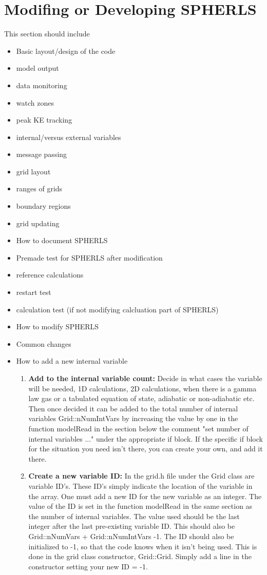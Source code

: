 \documentclass[12pt,a4paper]{book}
\begin{document}
\section{Modifing or Developing SPHERLS}
This section should include
\begin{itemize}
\item Basic layout/design of the code
\item model output
\item data monitoring
\item watch zones
\item peak KE tracking
\item internal/versus external variables
\item message passing
\item grid layout
\item ranges of grids
\item boundary regions
\item grid updating
\item How to document SPHERLS
\item Premade test for SPHERLS after modification
\item reference calculations
\item restart test
\item calculation test (if not modifying calcluation part of SPHERLS)
\item How to modify SPHERLS
\item Common changes
\item How to add a new internal variable
\begin{enumerate}
\item \textbf{Add to the internal variable count:} Decide in what cases the variable will be needed, 1D calculations, 2D calculations, when there is a gamma law gas or a tabulated equation of state, adiabatic or non-adiabatic etc. Then once decided it can be added to the total number of internal variables Grid::nNumIntVars by increasing the value by one in the function modelRead in the section below the comment "set number of internal variables ..." under the appropriate if block. If the specific if block for the situation you need isn't there, you can create your own, and add it there.
\item \textbf{Create a new variable ID:} In the grid.h file under the Grid class are variable ID's. These ID's simply indicate the location of the variable in the array. One must add a new ID for the new variable as an integer. The value of the ID is set in the function modelRead in the same section as the number of internal variables. The value used should be the last integer after the last pre-existing variable ID. This should also be Grid::nNumVars + Grid::nNumIntVars -1. The ID should also be initialized to -1, so that the code knows when it isn't being used. This is done in the grid class constructor, Grid::Grid. Simply add a line in the constructor setting your new ID = -1.

\end{enumerate}
\end{itemize}
\end{document}
